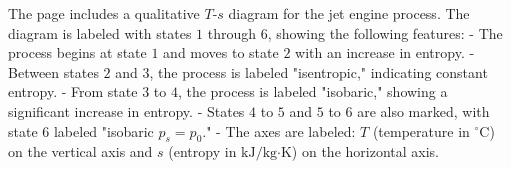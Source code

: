 The page includes a qualitative \( T \)-\( s \) diagram for the jet engine process. The diagram is labeled with states \( 1 \) through \( 6 \), showing the following features:  
- The process begins at state \( 1 \) and moves to state \( 2 \) with an increase in entropy.  
- Between states \( 2 \) and \( 3 \), the process is labeled "isentropic," indicating constant entropy.  
- From state \( 3 \) to \( 4 \), the process is labeled "isobaric," showing a significant increase in entropy.  
- States \( 4 \) to \( 5 \) and \( 5 \) to \( 6 \) are also marked, with state \( 6 \) labeled "isobaric \( p_s = p_0 \)."  
- The axes are labeled: \( T \) (temperature in \( ^\circ \text{C} \)) on the vertical axis and \( s \) (entropy in \( \text{kJ/kg·K} \)) on the horizontal axis.